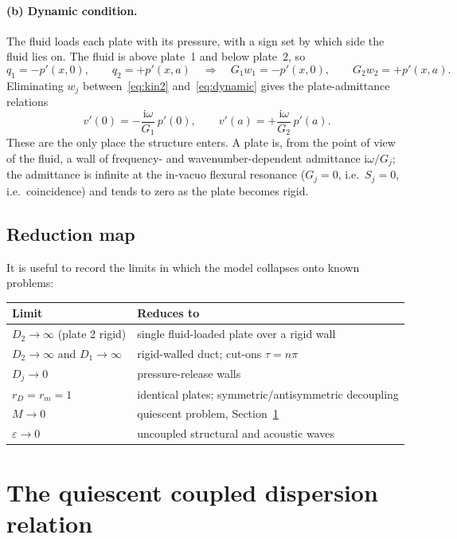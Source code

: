 \documentclass[11pt,a4paper]{article}
\newcommand{\eps}{\varepsilon}
\newcommand{\ii}{\mathrm{i}}
\theoremstyle{plain}
\theoremstyle{remark}
\begin{document}
\paragraph{(b) Dynamic condition.} The fluid loads each plate with its pressure, with a sign set by
which side the fluid lies on. The fluid is above plate~1 and below plate~2, so
\begin{equation}
q_1=-p'(x,0),\qquad q_2=+p'(x,a)
\quad\Longrightarrow\quad
G_1w_1=-p'(x,0),\qquad G_2w_2=+p'(x,a).
\label{eq:dynamic}
\end{equation}
Eliminating $w_j$ between~\eqref{eq:kin2} and~\eqref{eq:dynamic} gives the plate-admittance relations
\begin{equation}
\boxed{\;v'(0)=-\frac{\ii\omega}{G_1}\,p'(0),\qquad
v'(a)=+\frac{\ii\omega}{G_2}\,p'(a).\;}
\label{eq:adm}
\end{equation}
These are the only place the structure enters. A plate is, from the point of view of the fluid, a wall
of frequency- and wavenumber-dependent admittance $\ii\omega/G_j$; the admittance is infinite at the
in-vacuo flexural resonance ($G_j=0$, i.e.\ $S_j=0$, i.e.\ coincidence) and tends to zero as the plate
becomes rigid.

\subsection{Reduction map}
It is useful to record the limits in which the model collapses onto known problems:
\begin{center}
\begin{tabular}{@{}ll@{}}
\toprule
Limit & Reduces to\\
\midrule
$D_2\to\infty$ (plate 2 rigid) & single fluid-loaded plate over a rigid wall~\cite{sarkarsonti}\\
$D_2\to\infty$ and $D_1\to\infty$ & rigid-walled duct; cut-ons $\tau=n\pi$\\
$D_j\to0$ & pressure-release walls\\
$r_D=r_m=1$ & identical plates; symmetric/antisymmetric decoupling\\
$M\to0$ & quiescent problem, Section~\ref{sec:quiescent}\\
$\eps\to0$ & uncoupled structural and acoustic waves\\
\bottomrule
\end{tabular}
\end{center}

\section{The quiescent coupled dispersion relation}\label{sec:quiescent}
\end{document}
